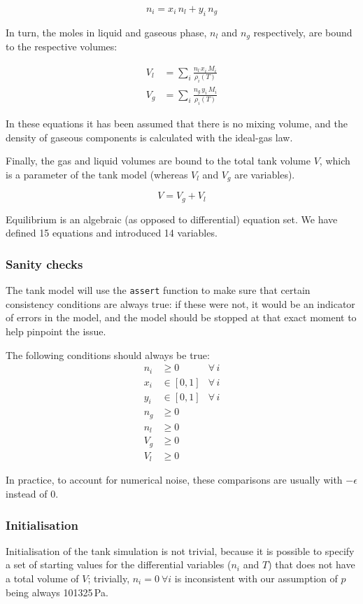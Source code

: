 \documentclass[a4paper]{article}
\begin{document}
\begin{equation}
n_i = x_i \, n_l + y_i \, n_g
\end{equation}

In turn, the moles in liquid and gaseous phase,  $n_l$ and $n_g$ respectively,
are bound to the respective volumes:

\begin{align}
V_l &= \sum_i \frac{n_l \, x_i \, M_i}{\rho_i(T)}\\
V_g &= \sum_i \frac{n_g \, y_i \, M_i}{\rho_i(T)}
\end{align}

In these equations it has been assumed that there is no mixing volume, and the
density of gaseous components is calculated with the ideal-gas law.

Finally, the gas and liquid volumes are bound to the total tank volume $V$,
which is a parameter of the tank model (whereas $V_l$ and $V_g$ are variables).

\begin{equation}
V = V_g + V_l
\end{equation}

Equilibrium is an algebraic (as opposed to differential) equation set. We have
defined 15 equations and introduced 14 variables.

\subsubsection{Sanity checks}
The tank model will use the \texttt{assert} function to make sure that certain
consistency conditions are always true: if these were not, it would be an
indicator of errors in the model, and the model should be stopped at that exact
moment to help pinpoint the issue.

The following conditions should always be true:
\begin{align}
n_i & \geq 0 & \forall \, i\\
x_i & \in [0,1] & \forall \, i\\
y_i & \in [0,1] & \forall \, i\\
n_g & \geq 0\\
n_l & \geq 0\\
V_g & \geq 0\\
V_l & \geq 0
\end{align}

In practice, to account for numerical noise, these comparisons are usually
with $-\epsilon$ instead of 0.

\subsubsection{Initialisation}
Initialisation of the tank simulation is not trivial, because it is possible to
specify a set of starting values for the differential variables ($n_i$ and $T$)
that does not have a total volume of $V$; trivially, $n_i = 0 ~ \forall i$ is
inconsistent with our assumption of $p$ being always 101325\,Pa.
\end{document}
